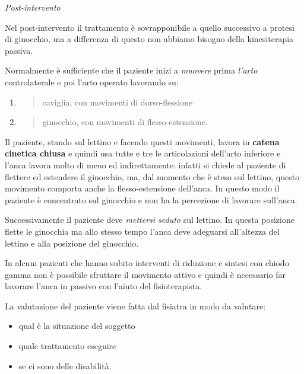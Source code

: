 \documentclass[]{article}
\begin{document}
\emph{Post-intervento}

Nel post-intervento il trattamento è sovrapponibile a quello successivo
a protesi di ginocchio, ma a differenza di questo non abbiamo bisogno
della kinesiterapia passiva.

Normalmente è sufficiente che il paziente inizi a \emph{muovere} prima
\emph{l'arto} controlaterale e poi l'arto operato lavorando su:

\begin{enumerate}
\def\labelenumi{\arabic{enumi}.}
\item
  \begin{quote}
  caviglia, con movimenti di dorso-flessione
  \end{quote}
\item
  \begin{quote}
  ginocchio, con movimenti di flesso-estensione.
  \end{quote}
\end{enumerate}

Il paziente, stando sul lettino e facendo questi movimenti, lavora in
\textbf{catena cinetica chiusa} e quindi usa tutte e tre le
articolazioni dell'arto inferiore e l'anca lavora molto di meno ed
indirettamente: infatti si chiede al paziente di flettere ed estendere
il ginocchio, ma, dal momento che è steso sul lettino, questo movimento
comporta anche la flesso-estensione dell'anca. In questo modo il
paziente è concentrato sul ginocchio e non ha la percezione di lavorare
sull'anca.

Successivamente il paziente deve \emph{mettersi seduto} sul lettino. In
questa posizione flette le ginocchia ma allo stesso tempo l'anca deve
adeguarsi all'altezza del lettino e alla posizione del ginocchio.

In alcuni pazienti che hanno subito interventi di riduzione e sintesi
con chiodo gamma non è possibile sfruttare il movimento attivo e quindi
è necessario far lavorare l'anca in passivo con l'aiuto del
fisioterapista.

La valutazione del paziente viene fatta dal fisiatra in modo da
valutare:

\begin{itemize}
\item
  qual è la situazione del soggetto
\end{itemize}

\begin{itemize}
\item
  quale trattamento eseguire
\item
  se ci sono delle disabilità.
\end{itemize}
\end{document}
